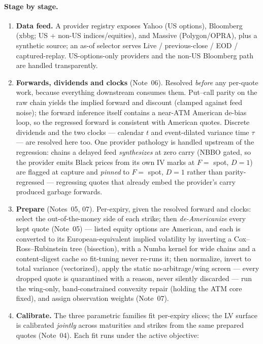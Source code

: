 \documentclass[11pt]{article}
\begin{document}
\paragraph{Stage by stage.}
\begin{enumerate}[leftmargin=1.6em]
\item \textbf{Data feed.} A provider registry exposes Yahoo (US options),
Bloomberg (xbbg; US + non-US indices/equities), and Massive (Polygon/OPRA), plus
a synthetic source; an as-of selector serves Live / previous-close / EOD /
captured-replay. US-options-only providers and the non-US Bloomberg path are
handled transparently.
\item \textbf{Forwards, dividends and clocks} (Note~06). Resolved \emph{before}
any per-quote work, because everything downstream consumes them. Put--call
parity on the raw chain yields the implied forward and discount (clamped
against feed noise); the forward inference itself contains a near-ATM American
de-bias loop, so the regressed forward is consistent with American quotes.
Discrete dividends and the two clocks --- calendar $t$ and event-dilated
variance time $\tau$ --- are resolved here too. One provider pathology is
handled upstream of the regression: chains a delayed feed \emph{synthesizes}
at zero carry (NBBO gated, so the provider emits Black prices from its own IV
marks at $F=$ spot, $D=1$) are flagged at capture and \emph{pinned} to
$F=$ spot, $D=1$ rather than parity-regressed --- regressing quotes that
already embed the provider's carry produced garbage forwards.
\item \textbf{Prepare} (Notes~05, 07). Per-expiry, given the resolved forward
and clocks: select the out-of-the-money side of each strike; then
\emph{de-Americanize} every kept quote (Note~05) --- listed equity options are
American, and each is converted to its European-equivalent implied volatility
by inverting a Cox--Ross--Rubinstein tree (bisection), with a Numba kernel for
wide chains and a content-digest cache so fit-tuning never re-runs it; then
normalize, invert to total variance (vectorized), apply the static
no-arbitrage/wing screen --- every dropped quote is quarantined with a reason,
never silently discarded --- run the wing-only, band-constrained convexity
repair (holding the ATM core fixed), and assign observation weights (Note~07).
\item \textbf{Calibrate.} The three parametric families fit per-expiry slices;
the LV surface is calibrated \emph{jointly} across maturities and strikes from
the same prepared quotes (Note~04). Each fit runs under the active objective:

\end{enumerate}
\end{document}
